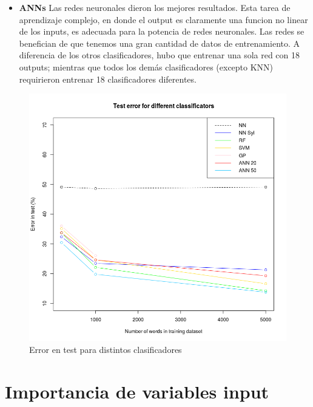 \documentclass[paper=a4, fontsize=11pt]{scrartcl} %
\numberwithin{equation}{section} %
\numberwithin{figure}{section} %
\numberwithin{table}{section} %
\begin{document}
\begin{itemize}
\item \textbf{ANNs} Las redes neuronales dieron los mejores resultados. Esta tarea de aprendizaje complejo, en donde el output es claramente una funcion no linear de los inputs, es adecuada para la potencia de redes neuronales. Las redes se benefician de que tenemos una gran cantidad de datos de entrenamiento. A diferencia de los otros clasificadores, hubo que entrenar una sola red con 18 outputs; mientras que todos los demás clasificadores (excepto KNN) requirieron entrenar 18 clasificadores diferentes.

\end{itemize}



\begin{center}
\begin{figure}[h!]
\includegraphics[width=170mm]{figure.png}
\caption{Error en test para distintos clasificadores}
\label{fig:results}

\end{figure}
\end{center}

\newpage

\section{ Importancia de variables input}
\end{document}
